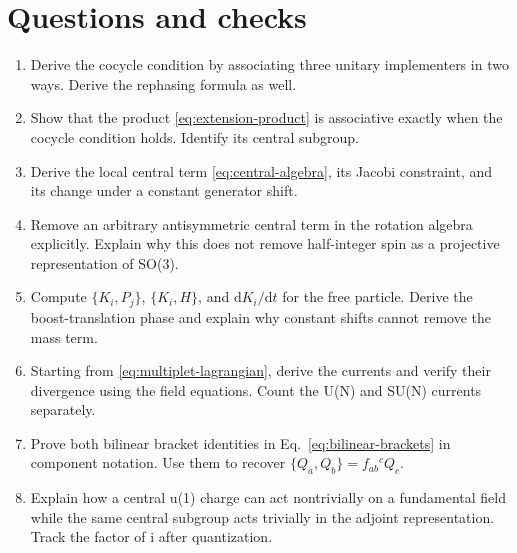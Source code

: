 \documentclass[11pt]{article}
\newcommand{\dd}{\mathrm{d}}
\begin{document}
\section*{Questions and checks}
\begin{enumerate}
\item Derive the cocycle condition by associating three unitary
implementers in two ways. Derive the rephasing formula as well.
\item Show that the product \eqref{eq:extension-product} is associative
exactly when the cocycle condition holds. Identify its central subgroup.
\item Derive the local central term \eqref{eq:central-algebra}, its
Jacobi constraint, and its change under a constant generator shift.
\item Remove an arbitrary antisymmetric central term in the rotation
algebra explicitly. Explain why this does not remove half-integer spin
as a projective representation of SO(3).
\item Compute \(\{K_i,P_j\}\), \(\{K_i,H\}\), and \(\dd K_i/\dd t\)
for the free particle. Derive the boost-translation phase and explain why
constant shifts cannot remove the mass term.
\item Starting from \eqref{eq:multiplet-lagrangian}, derive the currents
and verify their divergence using the field equations. Count the U(N)
and SU(N) currents separately.
\item Prove both bilinear bracket identities in
Eq.~\eqref{eq:bilinear-brackets} in component notation. Use them to
recover \(\{Q_a,Q_b\}=f_{ab}{}^cQ_c\).
\item Explain how a central u(1) charge can act nontrivially on a
fundamental field while the same central subgroup acts trivially in the
adjoint representation. Track the factor of i after quantization.
\end{enumerate}

\clearpage
\end{document}
